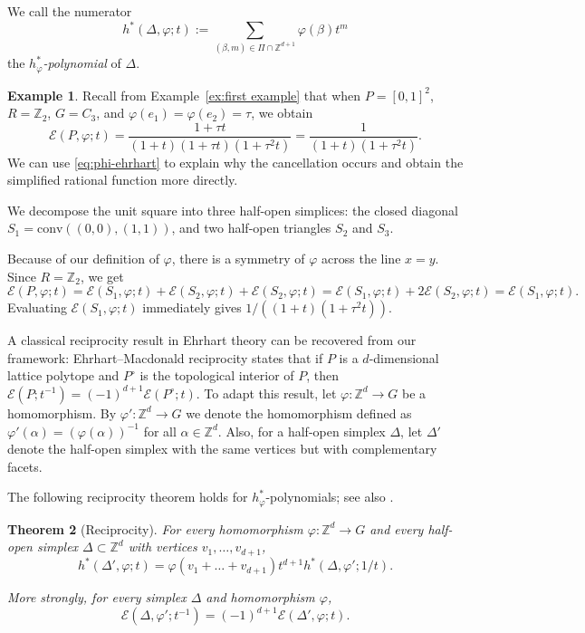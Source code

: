 \documentclass[12pt,reqno]{amsart}
\newtheorem{thm}{Theorem}[section]
\theoremstyle{definition}
\newtheorem{exam}[thm]{Example}
\theoremstyle{remark}
\newcommand{\conv}{\mathrm{conv}}
\newcommand{\Z}{\mathbb{Z}}
\renewcommand{\phi}{\varphi}
\begin{document}
We call the numerator \[h^*(\Delta,\phi;t) := \sum_{(\beta,m) \in \Pi\cap \Z^{d+1}} \varphi(\beta) t^m\] the {\it $h^*_\phi$-polynomial} of $\Delta$. 

\begin{exam}
    Recall from Example~\ref{ex:first example} that when $P = [0,1]^2$, $R = \Z_2$, $G = C_3$, and $\varphi(e_1) = \varphi(e_2) = \tau$, we obtain
    \[
        \mathcal{E}(P,\varphi;t) = \frac{1+\tau t}{(1+t)(1+\tau t)(1+\tau^2t)} = \frac{1}{(1+t)(1+\tau^2t)}.
    \]
    We can use \eqref{eq:phi-ehrhart} to explain why the cancellation occurs and obtain the simplified rational function more directly.

    We decompose the unit square into three half-open simplices: the closed diagonal $S_1=\conv((0,0),(1,1))$, and two half-open triangles $S_2$ and $S_3$.
    
    Because of our definition of $\varphi$, there is a symmetry of $\varphi$ across the line $x=y$.
    Since $R = \Z_2$, we get
    \[
        \mathcal{E}(P,\varphi;t)= \mathcal{E}(S_1,\varphi;t) + \mathcal{E}(S_2,\varphi;t) + \mathcal{E}(S_2,\varphi;t) = \mathcal{E}(S_1,\varphi;t) + 2\mathcal{E}(S_2,\varphi;t) = \mathcal{E}(S_1,\varphi;t).
    \]
    Evaluating $\mathcal{E}(S_1,\varphi;t)$ immediately gives $1/((1+t)(1+\tau^2t))$.
\end{exam}

A classical reciprocity result in Ehrhart theory can be recovered from our framework: Ehrhart--Macdonald reciprocity states that if $P$ is a $d$-dimensional lattice polytope and $P^{\circ}$ is the topological interior of $P$, then $\mathcal{E}(P;t^{-1}) = (-1)^{d+1}\mathcal{E}(P^{\circ};t)$.
To adapt this result, let $\phi: \Z^d \to G$ be a homomorphism. By $\phi': \Z^d \to G$ we denote the homomorphism defined as $\phi'(\alpha)=(\phi(\alpha))^{-1}$ for all $\alpha\in\Z^d$. Also, for a half-open simplex $\Delta$, let $\Delta'$ denote the half-open simplex with the same vertices but with complementary facets.

The following reciprocity theorem holds for $h_{\varphi}^*$-polynomials; see also \cite[Thm. 5.8]{schilling2025}.

\begin{thm}[Reciprocity]\label{thm:phi-reciprocity}
For every homomorphism $\phi:\Z^d\to G$ and every half-open simplex $\Delta\subset \Z^d$ with vertices $v_1,\ldots,v_{d+1}$,
$$h^*(\Delta',\phi;t)=\phi(v_1+\ldots+v_{d+1})t^{d+1}h^*(\Delta,\phi';1/t).$$

More strongly,
for every simplex $\Delta$ and homomorphism $\phi$,
$$\mathcal E(\Delta,\phi';t^{-1})=(-1)^{d+1}\mathcal E(\Delta',\phi;t).$$
\end{thm}
\end{document}
